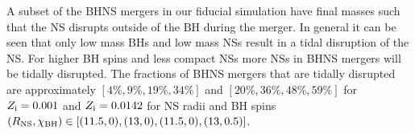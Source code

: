 \documentclass[twocolumn]{aastex63}
\newcommand\bhnsSingle{BHNS\xspace}
\newcommand{\Zi}{\ensuremath{Z_{\rm{i}}}\xspace}
\newcommand{\km}{\ensuremath{\,\rm{km}}\xspace}
\newcommand{\Msun}{\ensuremath{\,\rm{M}_{\odot}}\xspace}
\newcommand{\qf}{\ensuremath{q_{\rm{f}}}\xspace}
\newcommand{\chibh}{\ensuremath{{\chi}_{\rm{BH}}}\xspace}
\begin{document}
A subset of the \bhnsSingle mergers in our fiducial simulation have  final masses such that the \ac{NS} disrupts outside of the \ac{BH} during the merger.  
In general it can be seen that only low mass \acp{BH} and low mass \acp{NS} result in a tidal disruption of the \ac{NS}. For higher \ac{BH} spins and less compact \acp{NS} more \acp{NS} in \bhnsSingle mergers will be tidally disrupted. 
  The fractions of \bhnsSingle mergers that are tidally disrupted  are approximately  $[4\%, 9\%, 19\%, 34\%]$  and $[20\%, 36\%, 48\%, 59\%]$ for $\Zi = 0.001$ and $\Zi = 0.0142$ for \ac{NS} radii and \ac{BH} spins $(R_{\rm{NS}}, \chibh) \in [(11.5,0), (13,0), (11.5, 0), (13, 0.5)]$.





%
\end{document}

